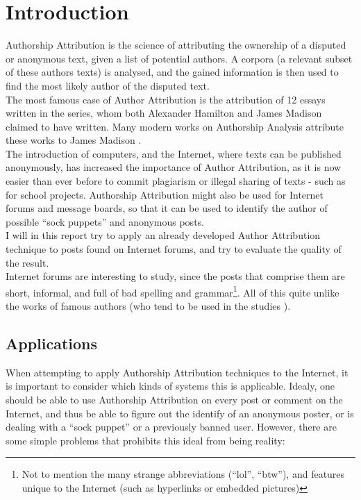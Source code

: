\section{Introduction}
\label{introduction}
Authorship Attribution is the science of attributing the ownership of a disputed or anonymous text, given a list of potential authors. A corpora (a relevant subset of these authors texts) is analysed, and the gained information is then used to find the most likely author of the disputed text.\\

The most famous case of Author Attribution is the attribution of 12 essays written in the  series, whom both Alexander Hamilton and James Madison claimed to have written. Many modern works on Authorship Analysis attribute these works to James Madison \cite{Fung03thedisputed}.\\
 The introduction of computers, and the Internet, where texts can be published anonymously, has increased the importance of Author Attribution, as it is now easier than ever before to commit plagiarism or illegal sharing of texts - such as for school projects. Authorship Attribution might also be used for Internet forums and message boards, so that it can be used to identify the author of possible ``sock puppets''  and anonymous posts.\\ 

I will in this report try to apply an already developed Author Attribution technique to posts found on Internet forums, and try to evaluate the quality of the result.\\

Internet forums are interesting to study, since the posts that comprise them are short, informal, and full of bad spelling and grammar\footnote{Not to mention the many strange abbreviations (``lol'', ``btw''), and features unique to the Internet (such as hyperlinks or embedded pictures)}. All of this quite unlike the works of famous authors (who tend to be used in the studies \cite{nr4}). 

\subsection{Applications}
When attempting to apply Authorship Attribution techniques to the Internet, it is important to consider which kinds of systems this is applicable. Idealy, one should be able to use Authorship Attribution on every post or comment on the Internet, and thus be able to figure out the identify of an anonymous poster, or is dealing with a ``sock puppet'' or a previously banned user. However, there are some simple problems that prohibits this ideal from being reality:

